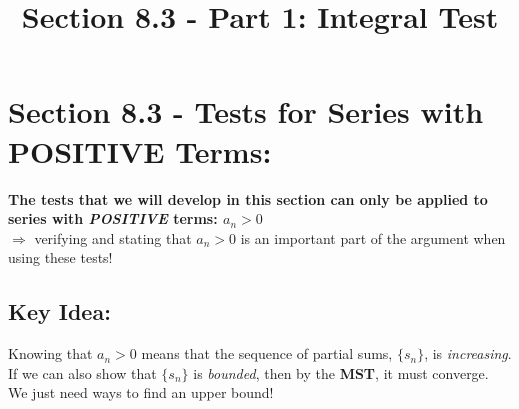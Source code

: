 \documentclass[10pt]{article}
\begin{document}
\newcommand{\an}{\lbrace a_n \rbrace}
\newcommand{\sn}{\lbrace s_n \rbrace}
\newcommand{\Sum}{\sum_{n=1}^\infty }

\everymath{\displaystyle}

\renewcommand{\myTitle}{\vspace*{-.25in}	MATH 1336: Calculus III}

\renewcommand{\mySubTitle}{Section 8.3 -  Part 1: Integral Test }


\title{\mySubTitle}\date{}
\maketitle


\hspace*{-.8in}%

\setlength{\columnseprule}{.4pt}
\setlength{\columnsep}{3em}

\section*{Section 8.3 - Tests for Series with POSITIVE Terms: }
\textbf{The tests that we will develop in this section can only be applied to series with \textit{POSITIVE} terms: \(a_n >0\)}\\
\(\Rightarrow\)  verifying and stating that \(a_n >0\) is an important part of the argument when using these tests!\\
\vspace*{.1in}
\subsection*{Key Idea:}
Knowing that \(a_n >0\) means that the sequence of partial sums, \(\sn\), is \textit{increasing}.\\
 If we can also show that \(\sn\)  is \textit{bounded}, then by the \textbf{MST}, it must converge. \\

We just need ways to find an upper bound!\\
\end{document}
